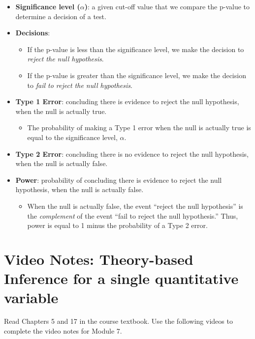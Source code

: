 \documentclass[
]{report}
\providecommand{\tightlist}{%
  \setlength{\itemsep}{0pt}\setlength{\parskip}{0pt}}
\begin{document}
\begin{itemize}
\item
  \textbf{Significance level (\(\alpha\))}: a given cut-off value that we compare the p-value to determine a decision of a test.
\item
  \textbf{Decisions}:

  \begin{itemize}
  \item
    If the p-value is less than the significance level, we make the decision to \emph{reject the null hypothesis}.
  \item
    If the p-value is greater than the significance level, we make the decision to \emph{fail to reject the null hypothesis}.
  \end{itemize}
\item
  \textbf{Type 1 Error}: concluding there is evidence to reject the null hypothesis, when the null is actually true.

  \begin{itemize}
  \tightlist
  \item
    The probability of making a Type 1 error when the null is actually true is equal to the significance level, \(\alpha\).
  \end{itemize}
\item
  \textbf{Type 2 Error}: concluding there is no evidence to reject the null hypothesis, when the null is actually false.
\item
  \textbf{Power}: probability of concluding there is evidence to reject the null hypothesis, when the null is actually false.

  \begin{itemize}
  \tightlist
  \item
    When the null is actually false, the event ``reject the null hypothesis'' is the \emph{complement} of the event ``fail to reject the null hypothesis.'' Thus, power is equal to 1 minus the probability of a Type 2 error.
  \end{itemize}
\end{itemize}

\newpage

\section{Video Notes: Theory-based Inference for a single quantitative variable}\label{video-notes-theory-based-inference-for-a-single-quantitative-variable}

Read Chapters 5 and 17 in the course textbook. Use the following videos to complete the video notes for Module 7.
\end{document}
